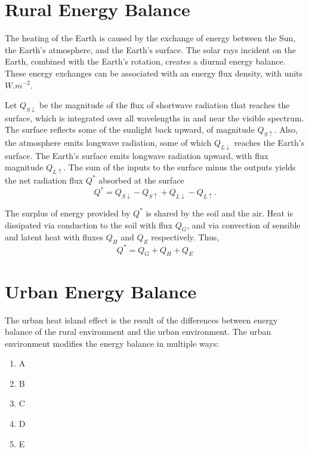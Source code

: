 \section{Rural Energy Balance}
	The heating of the Earth is caused by the exchange of energy between the Sun, the Earth's atmosphere, and the Earth's surface.
	The solar rays incident on the Earth, combined with the Earth's rotation, creates a diurnal energy balance.
	These energy exchanges can be associated with an energy flux density, with units $\si{W.m^{-2}}$.
	
	Let $Q_{S\downarrow}$ be the magnitude of the flux of shortwave radiation that reaches the surface, which is integrated over all wavelengths in and near	the visible spectrum.
	The surface reflects some of the sunlight back upward, of magnitude $Q_{S\uparrow}$.
	Also, the atmosphere emits longwave radiation, some of which
	$Q_{L\downarrow}$ reaches the Earth’s surface.
	The Earth’s surface emits longwave radiation upward, with flux magnitude $Q_{L\uparrow}$. 
	The sum of the inputs to the surface minus the outputs yields the net radiation flux $Q^*$ absorbed at the
	surface
	\begin{equation}
		Q^* = Q_{S\downarrow} - Q_{S\uparrow} + Q_{L\downarrow} - Q_{L\uparrow}.
	\end{equation}
	
	The surplus of energy provided by $Q^*$ is shared by the soil and the air.
	Heat is dissipated via conduction to the soil with flux $Q_G$,
		and via convection of sensible and latent heat with fluxes $Q_H$ and $Q_E$ respectively. 
	Thus,
	\begin{equation}
		Q^* = Q_G + Q_H + Q_E
	\end{equation}

\section{Urban Energy Balance}
	The urban heat island effect is the result of the differences between energy balance of the rural environment and the urban environment.
	The urban environment modifies the energy balance in multiple ways:
	\begin{enumerate}
		\item A
		\item B
		\item C
		\item D
		\item E
	\end{enumerate}

